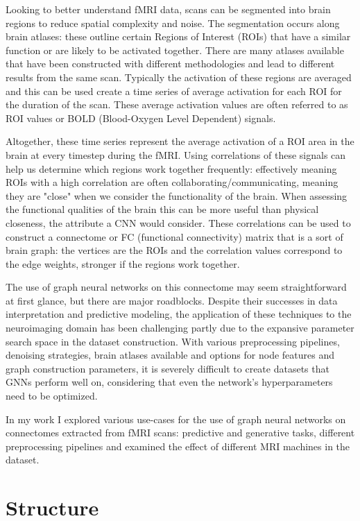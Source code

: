 Looking to better understand fMRI data, scans can be segmented into brain regions to reduce spatial complexity and noise. The segmentation occurs along brain atlases: these outline certain Regions of Interest (ROIs) that have a similar function or are likely to be activated together. There are many atlases available that have been constructed with different methodologies and lead to different results from the same scan. Typically the activation of these regions are averaged and this can be used create a time series of average activation for each ROI for the duration of the scan. These average activation values are often referred to as ROI values or BOLD (Blood-Oxygen Level Dependent) signals.

Altogether, these time series represent the average activation of a ROI area in the brain at every timestep during the fMRI. Using correlations of these signals can help us determine which regions work together frequently: effectively meaning ROIs with a high correlation are often collaborating/communicating, meaning they are "close" when we consider the functionality of the brain. When assessing the functional qualities of the brain this can be more useful than physical closeness, the attribute a CNN would consider. These correlations can be used to construct a connectome or FC (functional connectivity) matrix that is a sort of brain graph: the vertices are the ROIs and the correlation values correspond to the edge weights, stronger if the regions work together.

The use of graph neural networks on this connectome may seem straightforward at first glance, but there are major roadblocks. Despite their successes in data interpretation and predictive modeling, the application of these techniques to the neuroimaging domain has been challenging partly due to the expansive parameter search space in the dataset construction. With various preprocessing pipelines, denoising strategies, brain atlases available and options for node features and graph construction parameters, it is severely difficult to create datasets that GNNs perform well on, considering that even the network's hyperparameters need to be optimized.

In my work I explored various use-cases for the use of graph neural networks on connectomes extracted from fMRI scans: predictive and generative tasks, different preprocessing pipelines and examined the effect of different MRI machines in the dataset.

\section{Structure}

